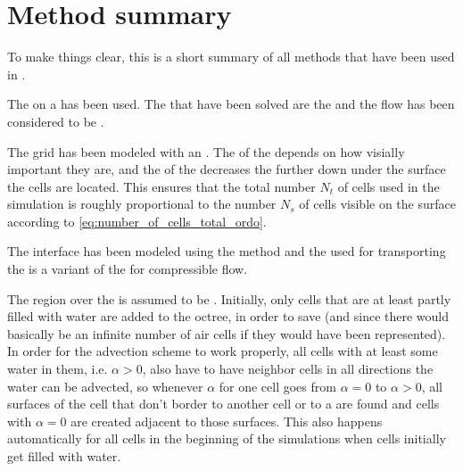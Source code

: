 \chapter{Method summary}

To make things clear, this is a short summary of all methods that have been used in \thisprojectwork.

The \FVM on a  has been used. The \PDEs that have been solved are the  and the flow has been considered to be .

The grid has been modeled with an \octree. The \LOD of the  depends on how visially important they are, and the \LOD of the  decreases the further down under the surface the cells are located. This ensures that the total number $N_t$ of cells used in the simulation is roughly proportional to the number $N_s$ of cells visible on the surface according to \eqref{eq:number_of_cells_total_ordo}.

The interface has been modeled using the \VOF method and the  used for transporting the  is a variant of the  for compressible flow.

The region over the  is assumed to be \air. Initially, only cells that are at least partly filled with water are added to the octree, in order to save  (and since there would basically be an infinite number of air cells if they would have been represented). In order for the advection scheme to work properly, all cells with at least some water in them, i.e. $\alpha > 0$, also have to have neighbor cells in all directions the water can be advected, so whenever $\alpha$ for one cell goes from $\alpha = 0$ to $\alpha > 0$, all surfaces of the cell that don't border to another cell or to a  are found and cells with $\alpha = 0$ are created adjacent to those surfaces. This also happens automatically for all cells in the beginning of the simulations when cells initially get filled with water.
